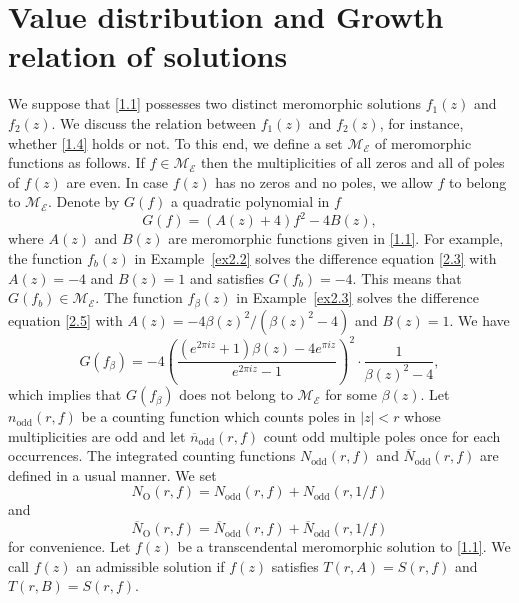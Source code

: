 \documentclass{amsart}
\begin{document}
\section{Value distribution and Growth relation of solutions}\label{VG}
We suppose that \eqref{1.1} possesses two distinct meromorphic solutions $f_1(z)$ and $f_2(z)$. We discuss the relation between $f_1(z)$ and $f_2(z)$, for instance, whether \eqref{1.4} holds or not.
To this end, we define a set $\mathcal{M_{\text{E}}}$ of meromorphic functions as follows.
If $f\in \mathcal{M_{\text{E}}}$ then the multiplicities of all zeros and all of poles of $f(z)$ are even. In case $f(z)$ has no zeros and no poles, we allow $f$ to belong to $\mathcal{M_{\text{E}}}$. Denote by $G(f)$ a quadratic polynomial in $f$
\begin{equation}
G(f)=(A(z)+4)f^2-4B(z),\label{5.1}
 \end{equation}
where $A(z)$ and $B(z)$ are meromorphic functions given in \eqref{1.1}.
For example, the function $f_b(z)$ in Example~\ref{ex2.2} solves the difference equation \eqref{2.3} with $A(z)=-4$ and $B(z)=1$ and satisfies
$G(f_b)=-4$. This means that $G(f_b)\in \mathcal{M_{\text{E}}}$.
The function $f_\beta(z)$ in Example~\ref{ex2.3} solves the difference equation \eqref{2.5} with $A(z)=-4\beta(z)^2/(\beta(z)^2-4)$ and $B(z)=1$. We have
$$
G(f_\beta)=-4\left(\frac{(e^{2\pi i z}+1)\beta(z)-4e^{\pi i z}}{e^{2\pi i z}-1}\right)^2\cdot \frac{1}{\beta(z)^2-4},
$$
which implies that $G(f_\beta)$ does not belong to $\mathcal{M_{\text{E}}}$ for some $\beta(z)$.
Let $n_{\text{odd}}(r,f)$ be a counting function which counts poles in $|z|<r$ whose multiplicities are
odd and let $\overline n_{\text{odd}}(r,f)$ count odd multiple poles once for each occurrences.
The integrated counting functions $N_{\text{odd}}(r,f)$ and $\overline N_{\text{odd}}(r,f)$ are
defined in a usual manner. We set
    $$N_{\text{O}}(r,f)=N_{\text{odd}}(r,f)+N_{\text{odd}}(r,1/f)$$
and
    $$\overline N_{\text{O}}(r,f)=\overline N_{\text{odd}}(r,f)+\overline N_{\text{odd}}(r,1/f)$$
for convenience. Let $f(z)$ be a transcendental meromorphic solution to \eqref{1.1}. We call $f(z)$ an admissible solution if $f(z)$ satisfies $T(r,A)=S(r,f)$ and $T(r,B)=S(r,f)$.
\end{document}
